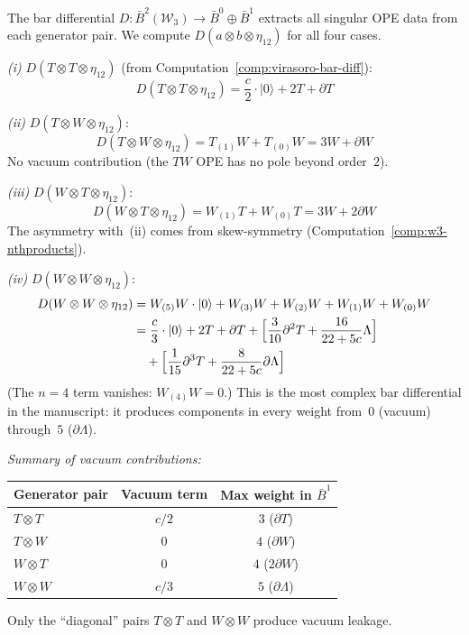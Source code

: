 \begin{computation}\label{comp:w3-bar-degree2}
The bar differential $D \colon \bar{B}^2(\mathcal{W}_3) \to \bar{B}^0 \oplus \bar{B}^1$
extracts all singular OPE data from each generator pair.
We compute $D(a \otimes b \otimes \eta_{12})$ for all four cases.

\emph{(i)} $D(T \otimes T \otimes \eta_{12})$
(from Computation~\ref{comp:virasoro-bar-diff}):
\[
D(T \otimes T \otimes \eta_{12}) = \frac{c}{2}\cdot|0\rangle + 2T + \partial T
\]

\emph{(ii)} $D(T \otimes W \otimes \eta_{12})$:
\[
D(T \otimes W \otimes \eta_{12}) = T_{(1)}W + T_{(0)}W = 3W + \partial W
\]
No vacuum contribution (the $TW$ OPE has no pole beyond order~$2$).

\emph{(iii)} $D(W \otimes T \otimes \eta_{12})$:
\[
D(W \otimes T \otimes \eta_{12}) = W_{(1)}T + W_{(0)}T = 3W + 2\partial W
\]
The asymmetry with~(ii) comes from skew-symmetry
(Computation~\ref{comp:w3-nthproducts}).

\emph{(iv)} $D(W \otimes W \otimes \eta_{12})$:
\begin{align*}
D(W \otimes W \otimes \eta_{12})
&= W_{(5)}W \cdot |0\rangle + W_{(3)}W + W_{(2)}W + W_{(1)}W + W_{(0)}W \\
&= \frac{c}{3}\cdot|0\rangle + 2T + \partial T
  + \Bigl[\frac{3}{10}\partial^2 T + \frac{16}{22+5c}\Lambda\Bigr] \\
&\quad + \Bigl[\frac{1}{15}\partial^3 T + \frac{8}{22+5c}\partial\Lambda\Bigr]
\end{align*}
(The $n=4$ term vanishes: $W_{(4)}W = 0$.)
This is the most complex bar differential in the manuscript: it produces components
in every weight from~$0$ (vacuum) through~$5$ ($\partial\Lambda$).

\emph{Summary of vacuum contributions:}
\begin{center}
\begin{tabular}{lcc}
\textbf{Generator pair} & \textbf{Vacuum term} & \textbf{Max weight in $\bar{B}^1$} \\
\hline
$T \otimes T$ & $c/2$ & $3$ ($\partial T$) \\
$T \otimes W$ & $0$ & $4$ ($\partial W$) \\
$W \otimes T$ & $0$ & $4$ ($2\partial W$) \\
$W \otimes W$ & $c/3$ & $5$ ($\partial\Lambda$)
\end{tabular}
\end{center}
Only the ``diagonal'' pairs $T \otimes T$ and $W \otimes W$ produce vacuum leakage.
\end{computation}


